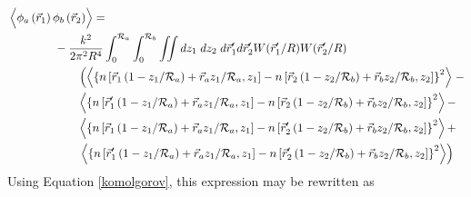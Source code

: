 \begin{equation}\label{prphase_n2}
\begin{aligned}
& \left\langle \vphantom{\hat{\phi}_{a}} \phi_{a}\left(\vec{r}_{1}\right) \phi_{b}\left(\vec{r}_{2}\right)\right\rangle = \\
&\quad\quad\quad\quad
-\frac{k^{2}}{2\pi^{2}R^{4}} \int_{0}^{\mathcal{R}_{a}}  \int_{0}^{\mathcal{R}_{b}} \iint dz_{1} \; dz_{2} \; d\vec{r}^{\prime}_{1}d\vec{r}^{\prime}_{2}  W(\vec{r}^{\prime}_{1}/R) W(\vec{r}^{\prime}_{2}/R)\\
&\quad\quad\quad\quad\quad\quad
\left(
\left\langle \left\{n\left[\vec{r}_{1}\left(1-z_{1}/\mathcal{R}_{a}\right) + \vec{r}_{a} z_{1}/\mathcal{R}_{a}, z_{1}\right] - 
 n\left[\vec{r}_{2}\left(1-z_{2}/\mathcal{R}_{b}\right) + \vec{r}_{b} z_{2}/\mathcal{R}_{b}, z_{2}\right] \right\}^{2} \right\rangle\right. - \\
&\quad\quad\quad\quad\quad\quad
\left\langle \left\{n\left[\vec{r}^{\prime}_{1}\left(1-z_{1}/\mathcal{R}_{a}\right) + \vec{r}_{a} z_{1}/\mathcal{R}_{a}, z_{1}\right] - 
 n\left[\vec{r}_{2}\left(1-z_{2}/\mathcal{R}_{b}\right) + \vec{r}_{b} z_{2}/\mathcal{R}_{b}, z_{2}\right] \right\}^{2} \right\rangle - \\
&\quad\quad\quad\quad\quad\quad
\left\langle \left\{n\left[\vec{r}_{1}\left(1-z_{1}/\mathcal{R}_{a}\right) + \vec{r}_{a} z_{1}/\mathcal{R}_{a}, z_{1}\right] - 
 n\left[\vec{r}^{\prime}_{2}\left(1-z_{2}/\mathcal{R}_{b}\right) + \vec{r}_{b} z_{2}/\mathcal{R}_{b}, z_{2}\right] \right\}^{2} \right\rangle + \\
&\quad\quad\quad\quad\quad\quad
\left.
\left\langle \left\{n\left[\vec{r}^{\prime}_{1}\left(1-z_{1}/\mathcal{R}_{a}\right) + \vec{r}_{a} z_{1}/\mathcal{R}_{a}, z_{1}\right] - 
 n\left[\vec{r}^{\prime}_{2}\left(1-z_{2}/\mathcal{R}_{b}\right) + \vec{r}_{b} z_{2}/\mathcal{R}_{b}, z_{2}\right] \right\}^{2} \right\rangle\right) \\
\end{aligned}
\end{equation}
Using Equation \ref{komolgorov}, this expression may be rewritten as
